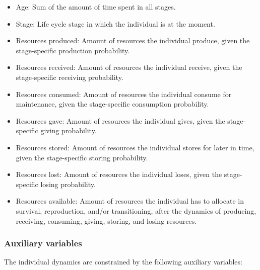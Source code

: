 \documentclass{article}
\begin{document}
\begin{itemize}
    \item Age: Sum of the amount of time spent in all stages.
    \item Stage: Life cycle stage in which the individual is at the moment.
    \item Resources produced: Amount of resources the individual produce, given the stage-specific production probability.
    \item Resources received: Amount of resources the individual receive, given the stage-specific receiving probability.
    \item Resources consumed: Amount of resources the individual consume for maintenance, given the stage-specific consumption probability.
    \item Resources gave: Amount of resources the individual gives, given the stage-specific giving probability.
    \item Resources stored: Amount of resources the individual stores for later in time, given the stage-specific storing probability.
    \item Resources lost: Amount of resources the individual loses, given the stage-specific losing probability.
    \item Resources available: Amount of resources the individual has to allocate in survival, reproduction, and/or transitioning, after the dynamics of producing, receiving, consuming, giving, storing, and losing resources.
\end{itemize}

\subsubsection{Auxiliary variables}

The individual dynamics are constrained by the following auxiliary variables:
\end{document}
